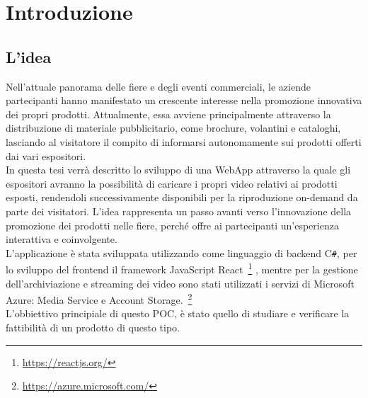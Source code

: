 \chapter{Introduzione}
\label{cap:introduzione}




\section{L'idea}

Nell'attuale panorama delle fiere e degli eventi commerciali, le aziende partecipanti hanno manifestato un crescente interesse nella promozione innovativa
dei propri prodotti. Attualmente, essa avviene principalmente attraverso la distribuzione di materiale pubblicitario, come brochure, volantini e cataloghi, 
lasciando al visitatore il compito di informarsi autonomamente sui prodotti offerti dai vari espositori.\\
In questa tesi verrà descritto lo sviluppo di una WebApp attraverso la quale gli espositori avranno la possibilità di caricare i propri video
relativi ai prodotti esposti, rendendoli successivamente disponibili per la riproduzione on-demand da parte dei visitatori.
L'idea rappresenta un passo avanti verso l'innovazione della promozione dei prodotti nelle fiere, perché offre ai partecipanti un'esperienza interattiva 
e coinvolgente. \\
L'applicazione è stata sviluppata utilizzando come linguaggio di backend C\texttt{\#}, per lo sviluppo del frontend il framework JavaScript React~\footnote{\url{https://reactjs.org/}}  ,
mentre per la gestione dell'archiviazione e streaming dei video sono stati utilizzati i servizi di Microsoft Azure: Media Service e Account Storage.~\footnote{\url{https://azure.microsoft.com/}}\\
L'obbiettivo principiale di questo POC, è stato quello di studiare e verificare la fattibilità di un prodotto di questo tipo.\\

